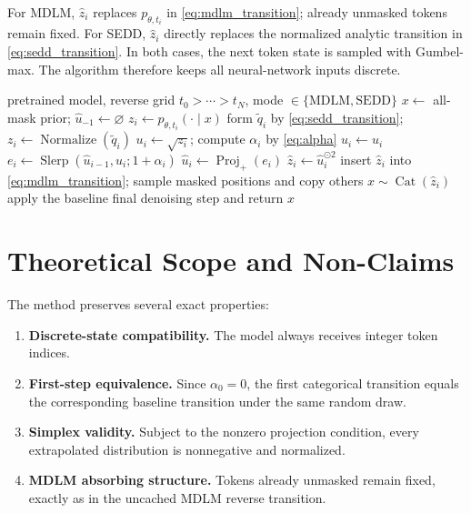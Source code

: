 \documentclass[10pt]{article}
\newcommand{\Slerp}{\operatorname{Slerp}}
\newcommand{\Projplus}{\operatorname{Proj}_{+}}
\newcommand{\Cat}{\operatorname{Cat}}
\begin{document}
For MDLM, $\widehat z_i$ replaces $p_{\theta,t_i}$ in \cref{eq:mdlm_transition}; already unmasked
tokens remain fixed.  For SEDD, $\widehat z_i$ directly replaces the normalized analytic transition in
\cref{eq:sedd_transition}.  In both cases, the next token state is sampled with Gumbel-max.  The
algorithm therefore keeps all neural-network inputs discrete.

\begin{algorithm}[t]
\caption{Geodesic momentum sampling for MDLM or SEDD}
\label{alg:gms}
\begin{algorithmic}[1]
\Require pretrained model, reverse grid $t_0>\cdots>t_N$, mode $\in\{\mathrm{MDLM},\mathrm{SEDD}\}$
\State $x\gets$ all-mask prior; $\widehat u_{-1}\gets\varnothing$
    \State $z_i\gets p_{\theta,t_i}(\cdot\mid x)$
  \Else
    \State form $\widetilde q_i$ by \cref{eq:sedd_transition}; $z_i\gets\operatorname{Normalize}(\widetilde q_i)$
  \EndIf
  \State $u_i\gets\sqrt{z_i}$; compute $\alpha_i$ by \cref{eq:alpha}
    \State $\widehat u_i\gets u_i$
  \Else
    \State $e_i\gets\Slerp(\widehat u_{i-1},u_i;1+\alpha_i)$
    \State $\widehat u_i\gets\Projplus(e_i)$
  \EndIf
  \State $\widehat z_i\gets\widehat u_i^{\odot2}$
    \State insert $\widehat z_i$ into \cref{eq:mdlm_transition}; sample masked positions and copy others
  \Else
    \State $x\sim\Cat(\widehat z_i)$
  \EndIf
\EndFor
\State apply the baseline final denoising step and return $x$
\end{algorithmic}
\end{algorithm}

\section{Theoretical Scope and Non-Claims}

The method preserves several exact properties:
\begin{enumerate}
  \item \textbf{Discrete-state compatibility.} The model always receives integer token indices.
  \item \textbf{First-step equivalence.} Since $\alpha_0=0$, the first categorical transition equals
  the corresponding baseline transition under the same random draw.
  \item \textbf{Simplex validity.} Subject to the nonzero projection condition, every extrapolated
  distribution is nonnegative and normalized.
  \item \textbf{MDLM absorbing structure.} Tokens already unmasked remain fixed, exactly as in the
  uncached MDLM reverse transition.
\end{enumerate}
\end{document}
